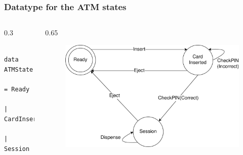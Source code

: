 \documentclass[compress,handout]{beamer}
\begin{document}
\begin{frame}[fragile]
  \frametitle{Datatype for the ATM states}

  \begin{columns}
  \begin{column}{0.3\framewidth}
    \begin{verbatim}
      data ATMState
        = Ready
        | CardInserted
        | Session
    \end{verbatim}
  \end{column}

  \begin{column}{0.65\framewidth}
    \begin{figure}
    \includegraphics[alt={The state diagram from slide 7.},width=\textwidth]{ATM.png}
    \end{figure}
  \end{column}
  \end{columns}

\end{frame}
\end{document}
